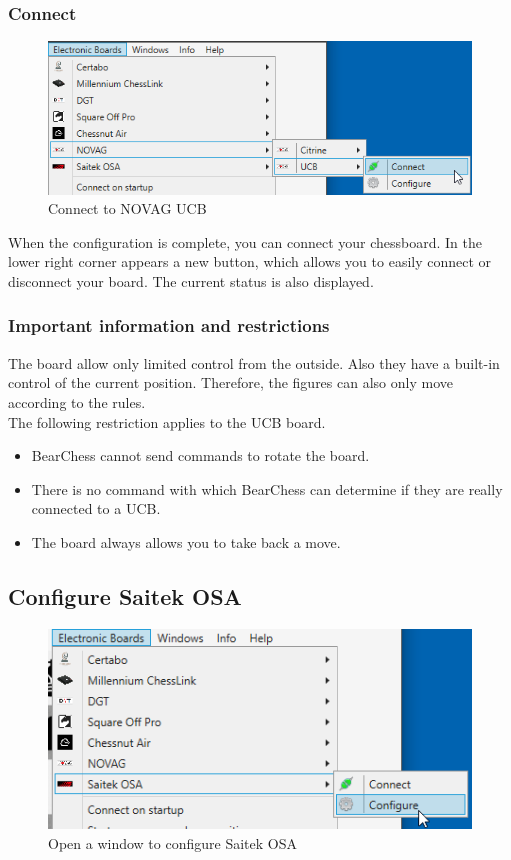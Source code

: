 \documentclass[11pt,a4paper]{article}
\begin{document}
\subsubsection{Connect}
\begin{figure}[H]
	\centering
	\includegraphics[scale=0.8]{NovagUCB3.png}
	\caption{Connect to NOVAG UCB}
	\label{fig:NovagUCB3}
\end{figure}
When the configuration is complete, you can connect your chessboard.
In the lower right corner appears a new button, which allows you to easily connect or disconnect your board. The current status is also displayed.

\subsubsection{Important information and restrictions} \label{InformationNovagUCB}
The board allow only limited control from the outside. Also they have a built-in control of the current position. Therefore, the figures can also only move according to the rules.\\
The following restriction applies to the UCB board.

\begin{itemize}
	\item BearChess cannot send commands to rotate the board.
	\item There is no command with which BearChess can determine if they are really connected to a UCB. 
	\item The board always allows you to take back a move.
\end{itemize}

\subsection{Configure Saitek OSA} \label{ConfigureSaitekOSA}

\begin{figure}[H]
	\centering
	\includegraphics[scale=1.0]{Saitek1.png}
	\caption{Open a window to configure Saitek OSA }
	\label{fig:Saitek1}
\end{figure}
\end{document}
